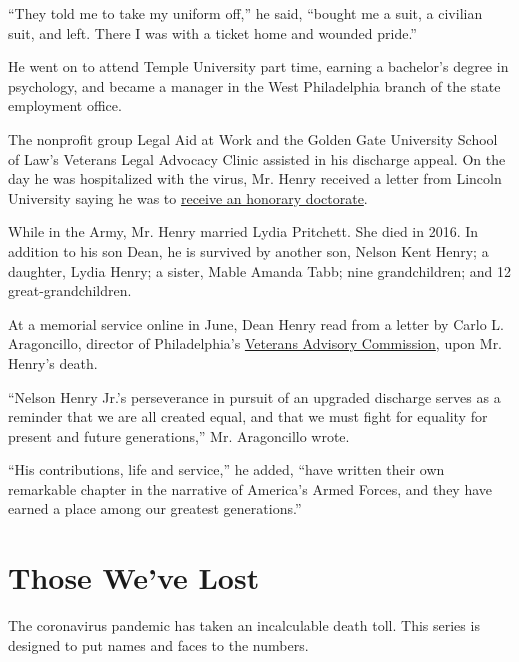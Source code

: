 ``They told me to take my uniform off,'' he said, ``bought me a suit, a
civilian suit, and left. There I was with a ticket home and wounded
pride.''

He went on to attend Temple University part time, earning a bachelor's
degree in psychology, and became a manager in the West Philadelphia
branch of the state employment office.

The nonprofit group Legal Aid at Work and the Golden Gate University
School of Law's Veterans Legal Advocacy Clinic assisted in his discharge
appeal. On the day he was hospitalized with the virus, Mr. Henry
received a letter from Lincoln University saying he was to
\href{https://www.lincoln.edu/news-and-events/news/attorney-ben-crump-speak-receive-honorary-degree-lincoln-university\%E2\%80\%99s-161st}{receive
an honorary doctorate}.

While in the Army, Mr. Henry married Lydia Pritchett. She died in 2016.
In addition to his son Dean, he is survived by another son, Nelson Kent
Henry; a daughter, Lydia Henry; a sister, Mable Amanda Tabb; nine
grandchildren; and 12 great-grandchildren.

At a memorial service online in June, Dean Henry read from a letter by
Carlo L. Aragoncillo, director of Philadelphia's
\href{http://phlcouncil.com/veterans-home/about-vac/}{Veterans Advisory
Commission}, upon Mr. Henry's death.

``Nelson Henry Jr.'s perseverance in pursuit of an upgraded discharge
serves as a reminder that we are all created equal, and that we must
fight for equality for present and future generations,'' Mr. Aragoncillo
wrote.

``His contributions, life and service,'' he added, ``have written their
own remarkable chapter in the narrative of America's Armed Forces, and
they have earned a place among our greatest generations.''

\href{https://www.nytimes.com/interactive/2020/obituaries/people-died-coronavirus-obituaries.html?action=click\&pgtype=Article\&state=default\&region=BELOW_MAIN_CONTENT\&context=covid_obits_promo}{}

\hypertarget{those-weve-lost}{%
\section{Those We've Lost}\label{those-weve-lost}}

The coronavirus pandemic has taken an incalculable death toll. This
series is designed to put names and faces to the numbers.

